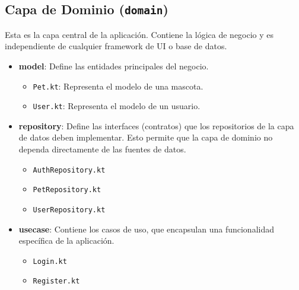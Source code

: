 \documentclass[12pt, a4paper]{article}
\begin{document}
\subsection{Capa de Dominio (\texttt{domain})}
Esta es la capa central de la aplicación. Contiene la lógica de negocio y es independiente de cualquier framework de UI o base de datos.
\begin{itemize}
    \item \textbf{model}: Define las entidades principales del negocio.
    \begin{itemize}
        \item \texttt{Pet.kt}: Representa el modelo de una mascota.
        \item \texttt{User.kt}: Representa el modelo de un usuario.
    \end{itemize}
    \item \textbf{repository}: Define las interfaces (contratos) que los repositorios de la capa de datos deben implementar. Esto permite que la capa de dominio no dependa directamente de las fuentes de datos.
    \begin{itemize}
        \item \texttt{AuthRepository.kt}
        \item \texttt{PetRepository.kt}
        \item \texttt{UserRepository.kt}
    \end{itemize}
    \item \textbf{usecase}: Contiene los casos de uso, que encapsulan una funcionalidad específica de la aplicación.
    \begin{itemize}
        \item \texttt{Login.kt}
        \item \texttt{Register.kt}
    \end{itemize}
\end{itemize}
\end{document}

